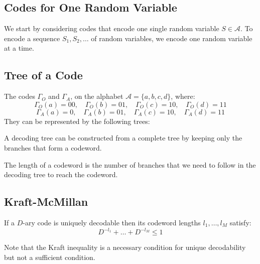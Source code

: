 \subsection{Codes for One Random Variable}
We start by considering codes that encode one single random variable $S \in \mathcal{A}$. To encode a sequence $S_1, S_2, \ldots$ of random variables, we encode one random variable at a time.

\subsection{Tree of a Code}

\begin{eg}
    The codes $\Gamma_O$ and $\Gamma_A$, on the alphabet $\mathcal{A} = \{a,b,c,d\}$, where:
    \[
        \Gamma_O(a) = 00, \quad \Gamma_O(b) = 01, \quad \Gamma_O(c) = 10, \quad \Gamma_O(d) = 11
    \]
    \[
        \Gamma_A(a) = 0, \quad \Gamma_A(b) = 01, \quad \Gamma_A(c) = 10, \quad \Gamma_A(d) = 11
    \]
    They can be represented by the following trees:
\end{eg}

\begin{definition}
    A decoding tree can be constructed from a complete tree by keeping only the branches that form a codeword.
\end{definition}

\begin{definition}
    The length of a codeword is the number of branches that we need to follow in the decoding tree to reach the codeword.
\end{definition}

\subsection{Kraft-McMillan}

\begin{theorem}
    If a $D$-ary code is uniquely decodable then its codeword lengths $l_1, \ldots, l_M$ satisfy:
    \[
        D^{-l_1} + \ldots + D^{-l_M} \leq 1
    \]
\end{theorem}
Note that the Kraft inequality is a necessary condition for unique decodability but not a sufficient condition.

